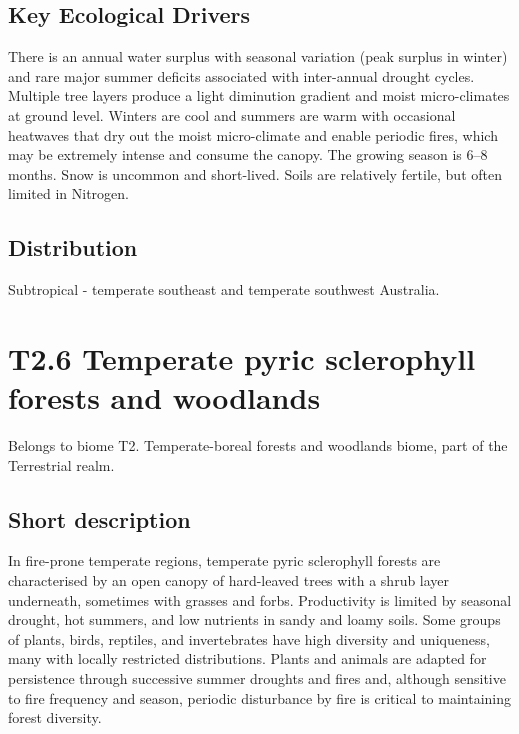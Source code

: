 \documentclass[
  letterpaper,
  DIV=11,
  numbers=noendperiod]{scrartcl}
\begin{document}
\subsection{Key Ecological Drivers}\label{key-ecological-drivers-77}

There is an annual water surplus with seasonal variation (peak surplus
in winter) and rare major summer deficits associated with inter-annual
drought cycles. Multiple tree layers produce a light diminution gradient
and moist micro-climates at ground level. Winters are cool and summers
are warm with occasional heatwaves that dry out the moist micro-climate
and enable periodic fires, which may be extremely intense and consume
the canopy. The growing season is 6--8 months. Snow is uncommon and
short-lived. Soils are relatively fertile, but often limited in
Nitrogen.

\subsection{Distribution}\label{distribution-77}

Subtropical - temperate southeast and temperate southwest Australia.

\section{T2.6 Temperate pyric sclerophyll forests and
woodlands}\label{t2.6-temperate-pyric-sclerophyll-forests-and-woodlands}

Belongs to biome T2. Temperate-boreal forests and woodlands biome, part
of the Terrestrial realm.

\subsection{Short description}\label{short-description-78}

In fire-prone temperate regions, temperate pyric sclerophyll forests are
characterised by an open canopy of hard-leaved trees with a shrub layer
underneath, sometimes with grasses and forbs. Productivity is limited by
seasonal drought, hot summers, and low nutrients in sandy and loamy
soils. Some groups of plants, birds, reptiles, and invertebrates have
high diversity and uniqueness, many with locally restricted
distributions. Plants and animals are adapted for persistence through
successive summer droughts and fires and, although sensitive to fire
frequency and season, periodic disturbance by fire is critical to
maintaining forest diversity.
\end{document}
